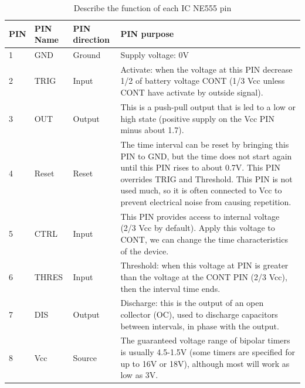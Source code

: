 \documentclass[a4paper]{report}
\begin{document}
        \begin{table}[ht] 
            \centering
            \begin{tabular}{ | l | l | l | p{7cm} | }
                \hline
                PIN & PIN Name & PIN direction & PIN purpose \\ \hline
                1 & GND & Ground & Supply voltage: 0V \\ \hline
                2 & TRIG & Input & Activate: when the voltage at this PIN decrease 1/2 of battery voltage CONT 
                (1/3 Vcc unless CONT have activate by outside signal). \\ \hline
                3 & OUT & Output & This is a push-pull output that is led to a low or high state (positive supply on the Vcc PIN minus about 1.7). \\ \hline
                4 & Reset & Reset & The time interval can be reset by bringing this PIN to GND, but the time does not 
                start again until this PIN rises to about 0.7V. This PIN overrides TRIG and Threshold. This PIN 
                is not used much, so it is often connected to Vcc to prevent electrical noise from causing repetition. \\ \hline
                5 & CTRL & Input & This PIN provides access to internal voltage (2/3 Vcc by default). Apply this 
                voltage to CONT, we can change the time characteristics of the device. \\ \hline
                6 & THRES & Input & Threshold: when this voltage at PIN is greater than the voltage at the CONT 
                PIN (2/3 Vcc), then the interval time ends. \\ \hline
                7 & DIS & Output & Discharge: this is the output of an open collector (OC), used to discharge 
                capacitors between intervals, in phase with the output. \\ \hline
                8 & Vcc & Source & The guaranteed voltage range of bipolar timers is usually 4.5-1.5V (some timers are specified for up to 16V or 18V), 
                although most will work as low as 3V. \\ 
                \hline
            \end{tabular}
            \caption{\label{tab:four}Describe the function of each IC NE555 pin}
        \end{table}
\end{document}
